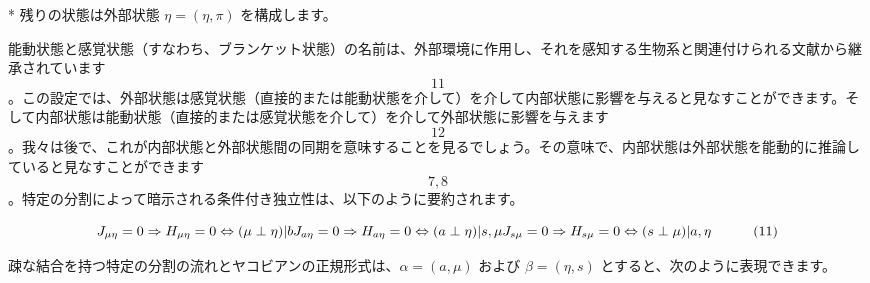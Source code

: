 \documentclass[a4paper, titlepage]{jsarticle}
\begin{document}
*   残りの状態は外部状態 $\eta = (\eta, \pi)$ を構成します。

能動状態と感覚状態（すなわち、ブランケット状態）の名前は、外部環境に作用し、それを感知する生物系と関連付けられる文献から継承されています \[11\]。この設定では、外部状態は感覚状態（直接的または能動状態を介して）を介して内部状態に影響を与えると見なすことができます。そして内部状態は能動状態（直接的または感覚状態を介して）を介して外部状態に影響を与えます \[12\]。我々は後で、これが内部状態と外部状態間の同期を意味することを見るでしょう。その意味で、内部状態は外部状態を能動的に推論していると見なすことができます \[7, 8\]。特定の分割によって暗示される条件付き独立性は、以下のように要約されます。

$$
J_{\mu\eta} = 0 \Rightarrow H_{\mu\eta} = 0 \Leftrightarrow (\mu \perp \eta) | b \\
J_{a\eta} = 0 \Rightarrow H_{a\eta} = 0 \Leftrightarrow (a \perp \eta) | s, \mu \\
J_{s\mu} = 0 \Rightarrow H_{s\mu} = 0 \Leftrightarrow (s \perp \mu) | a, \eta \quad \quad \quad (11)
$$

疎な結合を持つ特定の分割の流れとヤコビアンの正規形式は、$\alpha = (a, \mu)$ および $\beta = (\eta, s)$ とすると、次のように表現できます。
\end{document}

